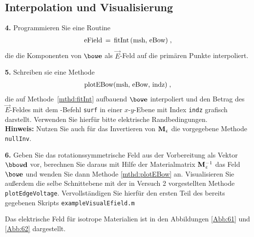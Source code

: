 \documentclass[Protokollheft.tex]{subfiles}
\begin{document}
\subsection{Interpolation und Visualisierung}

\begin{framed}
	\noindent \textbf{4.} Programmieren Sie eine Routine
\begin{align}
	\lstinline{eField = fitInt(msh, eBow)} \; , \label{mthd:fitInt}
\end{align}	
die die Komponenten von $\efit$ als $\vec{E}$-Feld auf die primären Punkte interpoliert.\label{exer:fitInt}
\end{framed}



\begin{framed}
	\noindent \textbf{5.} Schreiben sie eine Methode
\begin{align}
	\lstinline{plotEBow(msh, eBow, indz)} \; , \label{mthd:plotEBow}
\end{align}
die auf Methode~\eqref{mthd:fitInt} aufbauend $\efit$ interpoliert und den
Betrag des $\vec{E}$-Feldes mit dem \matlab-Befehl \lstinline{surf} in einer
$x$-$y$-Ebene mit Index \lstinline{indz} grafisch darstellt. Verwenden Sie hierfür bitte elektrische Randbedingungen.
\\
\textbf{Hinweis:} Nutzen Sie auch für das Invertieren von $\mathbf{M}_{\upvarepsilon}$ die vorgegebene Methode
\lstinline{nullInv}.\label{exer:plotEBow}
\end{framed}



\begin{framed}
	\noindent \textbf{6.} Geben Sie das rotationssymmetrische Feld aus der Vorbereitung als
Vektor $\dfit$ vor, berechnen Sie daraus mit Hilfe der Materialmatrix $\mathbf{M}_{\upvarepsilon}^{-1}$
das Feld $\efit$ und wenden Sie dann Methode \eqref{mthd:plotEBow} an. Visualisieren Sie außerdem die selbe Schnittebene mit der in Versuch 2 vorgestellten Methode \lstinline{plotEdgeVoltage}. Vervollständigen Sie hierfür den ersten Teil des bereits gegebenen Skripts \lstinline{exampleVisualEfield.m}\label{exer:exampleVisualEfield1}
\end{framed}
\noindent
Das elektrische Feld für isotrope Materialien ist in den Abbildungen \ref{Abb:61} und \ref{Abb:62} dargestellt.
\end{document}
